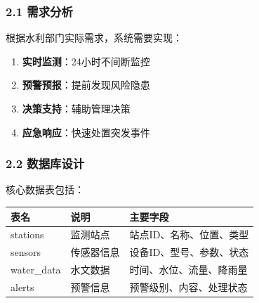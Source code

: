\documentclass[UTF8,12pt,a4paper,oneside]{ctexbook}
\begin{document}
\subsubsection{2.1 需求分析}\label{ux9700ux6c42ux5206ux6790}

根据水利部门实际需求，系统需要实现：

\begin{enumerate}
\def\labelenumi{\arabic{enumi}.}
\tightlist
\item
  \textbf{实时监测}：24小时不间断监控
\item
  \textbf{预警预报}：提前发现风险隐患
\item
  \textbf{决策支持}：辅助管理决策
\item
  \textbf{应急响应}：快速处置突发事件
\end{enumerate}

\subsubsection{2.2 数据库设计}\label{ux6570ux636eux5e93ux8bbeux8ba1}

核心数据表包括：

\begin{longtable}[]{@{}lll@{}}
\toprule\noalign{}
表名 & 说明 & 主要字段 \\
\midrule\noalign{}
\endhead
\bottomrule\noalign{}
\endlastfoot
stations & 监测站点 & 站点ID、名称、位置、类型 \\
sensors & 传感器信息 & 设备ID、型号、参数、状态 \\
water\_data & 水文数据 & 时间、水位、流量、降雨量 \\
alerts & 预警信息 & 预警级别、内容、处理状态 \\
\end{longtable}
\end{document}
